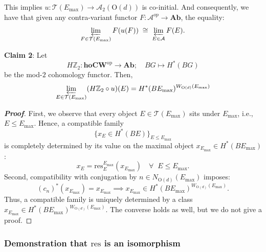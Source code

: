 \documentclass[aps,prx,reprint,superscriptaddress,twocolumn,amsmath,amssymb,amsfonts, nofootinbib]{revtex4-2}
\newcommand{\res}{\text{res}}
\theoremstyle{apsstyle}
\begin{document}
\bigskip  

\noindent This implies $u: \mathcal{T}(E_{\mathrm{max}}) \to \mathcal{A}_{2}(\mathrm{O}(d))$ is co-initial. And consequently, we have that given any contra-variant functor $F: \mathcal{A}^{op} \to \mathbf{Ab}$, the equality: $$\varprojlim_{F\in \mathcal{T}(E_{\mathrm{max}})} F(u(F)) \; \cong \; \varprojlim_{E\in \mathcal{A}} F(E).$$

\bigskip 

\noindent \textbf{Claim 2}: Let 
\begin{equation*}
H\mathbb{Z}_{2}: \mathbf{hoCW}^{\mathrm{op}} \to \mathbf{Ab}; \quad BG \mapsto H^{*}(BG) 
\end{equation*}
be the mod-$2$ cohomology functor. Then, 
\begin{equation*}
\varprojlim\limits_{E\in \mathcal{T}(E_{\mathrm{max}})} (H\mathbb{Z}_{2}\circ u) (E) = H^{*}(BE_{\mathrm{max}})^{W_{\mathrm{O}(d)}(E_{\mathrm{max}})}
\end{equation*}
\begin{proof}[\textnormal{\textbf{Proof}}] First, we observe that every object $E\in \mathcal{T}(E_{\mathrm{max}})$ sits under $E_{\mathrm{max}}$, i.e., $E\leq E_{\mathrm{max}}$. Hence, a compatible family 
\begin{equation*}
\{x_{E}\in H^{*}(BE)\}_{E\leq E_{\mathrm{max}}}
\end{equation*}
is completely determined by its value on the maximal object $x_{E_{\mathrm{max}}}\in H^{*}(BE_{\mathrm{max}})$: 
\begin{equation*}
x_{E} = \res^{E_{\mathrm{max}}}_{E}(x_{E_{\mathrm{max}}})\quad \forall\;\; E\leq E_{\mathrm{max}}.
\end{equation*}
\noindent Second, compatibility with conjugation by $n\in N_{\mathrm{O}(d)}(E_{\mathrm{max}})$ imposes: $$(c_{n})^{*}(x_{E_{\mathrm{max}}}) = x_{E_{\mathrm{max}}} \implies x_{E_{\mathrm{max}}} \in H^{*}(BE_{\mathrm{max}})^{W_{\mathrm{O}(d)}(E_{\mathrm{max}})}.$$
Thus, a compatible family is uniquely determined by a class $x_{E_{\mathrm{max}}}\in H^{*}(BE_{\mathrm{max}})^{W_{\mathrm{O}(d)}(E_{\mathrm{max}})}$. The converse holds as well, but we do not give a proof.
\end{proof}


\bigskip

\subsubsection{Demonstration that $\res$ is an isomorphism}
\end{document}

